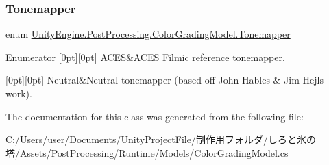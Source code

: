 \subsubsection{\texorpdfstring{Tonemapper}{Tonemapper}}
{\footnotesize\ttfamily enum \hyperlink{class_unity_engine_1_1_post_processing_1_1_color_grading_model_a4955bb9dfed7e27c93e7493ff66f3de6}{Unity\+Engine.\+Post\+Processing.\+Color\+Grading\+Model.\+Tonemapper}\hspace{0.3cm}{\ttfamily [strong]}}

\begin{DoxyEnumFields}{Enumerator}
[0pt][0pt]{}\mbox{\label{class_unity_engine_1_1_post_processing_1_1_color_grading_model_a4955bb9dfed7e27c93e7493ff66f3de6a01ec90d9624dce53f3f3492882841fe6}} 
A\+C\+ES&A\+C\+ES Filmic reference tonemapper. \\
\hline

[0pt][0pt]{}\mbox{\label{class_unity_engine_1_1_post_processing_1_1_color_grading_model_a4955bb9dfed7e27c93e7493ff66f3de6ae9bb5320b3890b6747c91b5a71ae5a01}} 
Neutral&Neutral tonemapper (based off John Hable\textquotesingle{}s \& Jim Hejl\textquotesingle{}s work). \\
\hline

\end{DoxyEnumFields}


The documentation for this class was generated from the following file\+:\begin{DoxyCompactItemize}
\item 
C\+:/\+Users/user/\+Documents/\+Unity\+Project\+File/制作用フォルダ/しろと氷の塔/\+Assets/\+Post\+Processing/\+Runtime/\+Models/Color\+Grading\+Model.\+cs\end{DoxyCompactItemize}
